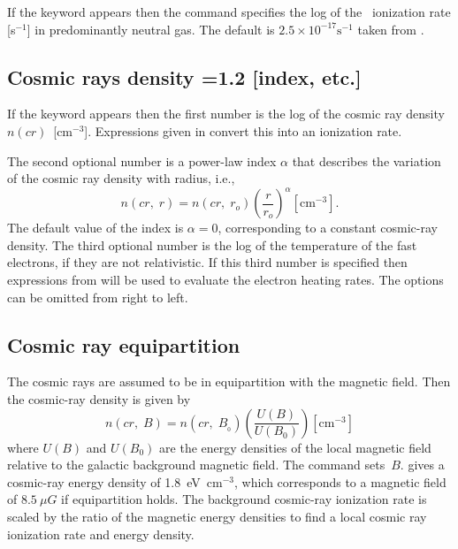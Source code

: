 If the keyword  appears then the command specifies
the log of the
\hO\ ionization rate [s$^{-1}$] in predominantly neutral gas.
The default is
$2.5\times 10^{-17} \mathrm{s}^{-1}$ taken from \citet{Williams1998}.

\subsection{Cosmic rays density =1.2 [index, etc.]}

If the keyword  appears then the first number
is the log of the
cosmic ray density $n(cr)$~[cm$^{-3}$].
Expressions given in \citet{FerlandMushotzky1984} convert this into an ionization rate.

The second optional number is a power-law index $\alpha $ that
describes the
variation of the cosmic ray density with radius, i.e.,
\begin{equation}
n\left( {cr,\;r} \right) = n\left( {cr,\;r_o } \right)\left( {\frac{r}{{r_o
}}} \right)^\alpha
 [\mathrm{cm}^{-3}]  .
\end{equation}
The default value of the index is  $\alpha =0$,
corresponding to a constant cosmic-ray density.
The third optional number is the log of the temperature of
the fast electrons, if they are not relativistic.
If this third number
is specified then expressions from \citet{Balbus1982} will be used
to evaluate the electron heating rates.
The options can be omitted from right to left.

\subsection{Cosmic ray equipartition}

The cosmic rays are assumed to be in equipartition with the magnetic
field.
Then the cosmic-ray density is given by
\begin{equation}
n\left( {cr,\;B} \right) = n\left( {cr,\;B_{_0 } } \right)\left(
{\frac{{U\left( B \right)}}{{U\left( {B_0 } \right)}}} \right)
[\mathrm{cm}^{-3}]%
\end{equation}
where $U(B)$ and $U(B_0)$ are the energy densities of the local
magnetic field
relative to the galactic background magnetic field.
The 
command sets~$B$.  \citet{Webber1998} gives a cosmic-ray
energy density of 1.8~eV~cm$^{-3}$,
which corresponds to a magnetic field of
$8.5~\mu G$ if equipartition holds.
The background cosmic-ray ionization rate
is scaled by the ratio of the magnetic energy densities to find a local
cosmic ray ionization rate and energy density.

